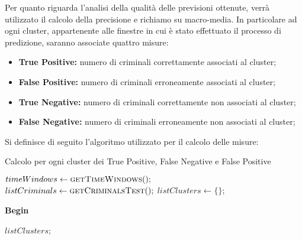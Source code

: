 Per quanto riguarda l'analisi della qualità delle previsioni ottenute, verrà utilizzato il calcolo della precisione e richiamo su macro-media.
In particolare ad ogni cluster, appartenente alle finestre in cui è stato effettuato il processo di predizione, saranno associate quattro misure:
\begin{itemize}
\item \textbf{True Positive:} numero di criminali correttamente associati al cluster;
\item \textbf{False Positive:} numero di criminali erroneamente associati al cluster;
\item \textbf{True Negative:} numero di criminali correttamente non associati al cluster;
\item \textbf{False Negative:} numero di criminali erroneamente non associati al cluster;
\end{itemize}
Si definisce di seguito l'algoritmo utilizzato per il calcolo delle misure:
\footnotesize
\begin{algorithm}[H]
\caption{Calcolo per ogni cluster dei True Positive, False Negative e False Positive }
\label{calcoloTPFNFP}
\begin{algorithmic}
	\State $timeWindows\gets \Call{getTimeWindows}{ };$	
	\State $listCriminals\gets \Call{getCriminalsTest}{ };$	
	\State $listClusters\gets \{\};$	
	\vspace*{+1cm}
 	
	\State \textbf{Begin}
 	
 	\State \Return $listClusters$;
\end{algorithmic}
\end{algorithm}
